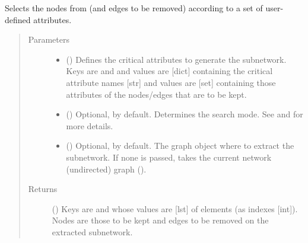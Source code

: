 \documentclass[letterpaper,10pt,english]{sphinxmanual}
\begin{document}
\begin{fulllineitems}
\begin{fulllineitems}
\label{\detokenize{reference:pypath.main.PyPath.get_sub}}
Selects the nodes from  (and edges to be removed)
according to a set of user-defined attributes.
\begin{quote}\begin{description}
\item[{Parameters}] \leavevmode\begin{itemize}
\item {} 
 () \textendash{} Defines the critical attributes to generate the subnetwork.
Keys are  and  and values are {[}dict{]}
containing the critical attribute names {[}str{]} and values
are {[}set{]} containing those attributes of the nodes/edges
that are to be kept.

\item {} 
 () \textendash{} Optional,  by default. Determines the search mode.
See {\hyperref[\detokenize{reference:pypath.main.PyPath.search_attr_or}]{}} and
{\hyperref[\detokenize{reference:pypath.main.PyPath.search_attr_and}]{}} for more
details.

\item {} 
 () \textendash{} Optional,  by default. The graph object where to
extract the subnetwork. If none is passed, takes the current
network (undirected) graph
().

\end{itemize}

\item[{Returns}] \leavevmode
() \textendash{} Keys are  and  whose
values are {[}lst{]} of elements (as indexes {[}int{]}). Nodes are
those to be kept and edges to be removed on the extracted
subnetwork.


\end{description}
\end{quote}
\end{fulllineitems}
\end{fulllineitems}
\end{document}
